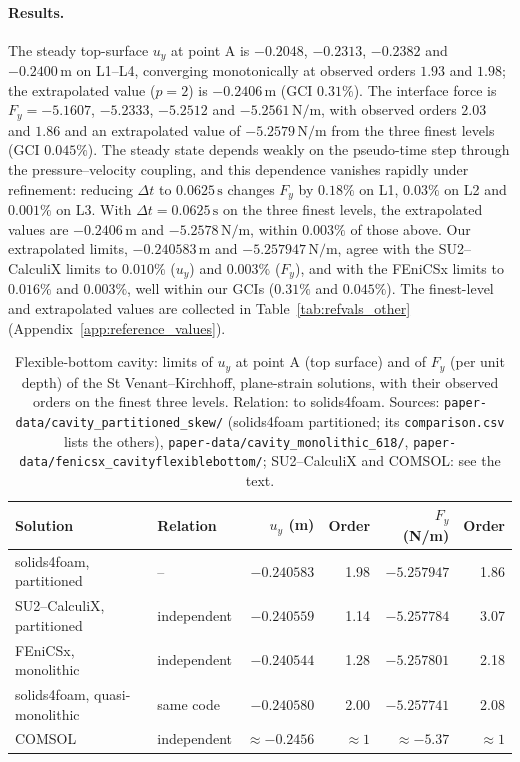 \paragraph{Results.}
The steady top-surface $u_y$ at point A is $-0.2048$, $-0.2313$, $-0.2382$ and $-0.2400\,\mathrm{m}$ on L1--L4, converging monotonically at observed orders $1.93$ and $1.98$; the extrapolated value ($p = 2$) is $-0.2406\,\mathrm{m}$ (GCI $0.31\%$). The interface force is $F_y = -5.1607$, $-5.2333$, $-5.2512$ and $-5.2561\,\mathrm{N/m}$, with observed orders $2.03$ and $1.86$ and an extrapolated value of $-5.2579\,\mathrm{N/m}$ from the three finest levels (GCI $0.045\%$).
The steady state depends weakly on the pseudo-time step through the pressure--velocity coupling, and this dependence vanishes rapidly under refinement: reducing $\Delta t$ to $0.0625\,\mathrm{s}$ changes $F_y$ by $0.18\%$ on L1, $0.03\%$ on L2 and $0.001\%$ on L3. With $\Delta t = 0.0625\,\mathrm{s}$ on the three finest levels, the extrapolated values are $-0.2406\,\mathrm{m}$ and $-5.2578\,\mathrm{N/m}$, within $0.003\%$ of those above.
Our extrapolated limits, $-0.240583\,\mathrm{m}$ and $-5.257947\,\mathrm{N/m}$, agree with the SU2--CalculiX limits to $0.010\%$ ($u_y$) and $0.003\%$ ($F_y$), and with the FEniCSx limits to $0.016\%$ and $0.003\%$, well within our GCIs ($0.31\%$ and $0.045\%$).
The finest-level and extrapolated values are collected in Table~\ref{tab:refvals_other} (Appendix~\ref{app:reference_values}).

\begin{table}[htbp]
	\centering
	\small
	\setlength{\tabcolsep}{4pt}
	\caption{Flexible-bottom cavity: limits of $u_y$ at point A (top surface) and of $F_y$ (per unit depth) of the St Venant--Kirchhoff, plane-strain solutions, with their observed orders on the finest three levels. Relation: to solids4foam. Sources: \texttt{paper-data/cavity\_partitioned\_skew/} (solids4foam partitioned; its \texttt{comparison.csv} lists the others), \texttt{paper-data/cavity\_monolithic\_618/}, \texttt{paper-data/fenicsx\_cavityflexiblebottom/}; SU2--CalculiX and COMSOL: see the text.}
	\label{tab:cavity_refs}
	\begin{tabular}{llrrrr}
		\toprule
		Solution & Relation & $u_y$ (m) & Order & $F_y$ (N/m) & Order \\
		\midrule
		solids4foam, partitioned & -- & $-0.240583$ & 1.98 & $-5.257947$ & 1.86 \\
		SU2--CalculiX, partitioned & independent & $-0.240559$ & 1.14 & $-5.257784$ & 3.07 \\
		FEniCSx, monolithic & independent & $-0.240544$ & 1.28 & $-5.257801$ & 2.18 \\
		solids4foam, quasi-monolithic & same code & $-0.240580$ & 2.00 & $-5.257741$ & 2.08 \\
		COMSOL & independent & $\approx-0.2456$ & $\approx1$ & $\approx-5.37$ & $\approx1$ \\
		\bottomrule
	\end{tabular}
\end{table}

